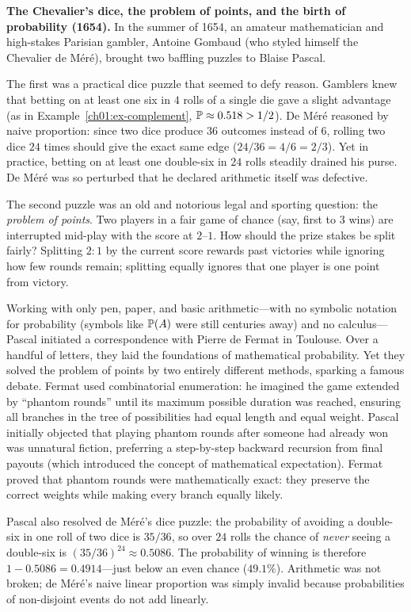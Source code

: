 \begin{historybox}
\textbf{The Chevalier's dice, the problem of points, and the birth of probability (1654).}
In the summer of 1654, an amateur mathematician and high-stakes Parisian gambler,
Antoine Gombaud (who styled himself the Chevalier de M\'er\'e), brought two
baffling puzzles to Blaise Pascal.

The first was a practical dice puzzle that seemed to defy reason. Gamblers knew
that betting on at least one six in $4$ rolls of a single die gave a slight
advantage (as in Example~\ref{ch01:ex-complement}, $\P \approx 0.518 > 1/2$).
De M\'er\'e reasoned by naive proportion: since two dice produce $36$ outcomes
instead of $6$, rolling two dice $24$ times should give the exact same edge
($24/36 = 4/6 = 2/3$). Yet in practice, betting on at least one double-six in
$24$ rolls steadily drained his purse. De M\'er\'e was so perturbed that he
declared arithmetic itself was defective.

The second puzzle was an old and notorious legal and sporting question: the
\emph{problem of points}. Two players in a fair game of chance (say, first to
$3$ wins) are interrupted mid-play with the score at $2$--$1$. How should the
prize stakes be split fairly? Splitting $2{:}1$ by the current score rewards past
victories while ignoring how few rounds remain; splitting equally ignores that
one player is one point from victory.

Working with only pen, paper, and basic arithmetic---with no symbolic notation
for probability (symbols like $\P(A)$ were still centuries away) and no
calculus---Pascal initiated a correspondence with Pierre de Fermat in Toulouse.
Over a handful of letters, they laid the foundations of mathematical probability.
Yet they solved the problem of points by two entirely different methods, sparking
a famous debate. Fermat used combinatorial enumeration: he imagined the game
extended by ``phantom rounds'' until its maximum possible duration was reached,
ensuring all branches in the tree of possibilities had equal length and equal
weight. Pascal initially objected that playing phantom rounds after someone had
already won was unnatural fiction, preferring a step-by-step backward recursion
from final payouts (which introduced the concept of mathematical expectation).
Fermat proved that phantom rounds were mathematically exact: they preserve the
correct weights while making every branch equally likely.

Pascal also resolved de M\'er\'e's dice puzzle: the probability of avoiding a
double-six in one roll of two dice is $35/36$, so over $24$ rolls the chance of
\emph{never} seeing a double-six is $(35/36)^{24} \approx 0.5086$. The probability
of winning is therefore $1 - 0.5086 = 0.4914$---just below an even chance ($49.1\%$).
Arithmetic was not broken; de M\'er\'e's naive linear proportion was simply
invalid because probabilities of non-disjoint events do not add linearly.


\end{historybox}
